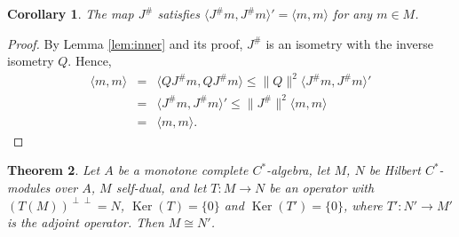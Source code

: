 \documentclass[12pt]{amsart}
\newtheorem{teo}{Theorem}%
\newtheorem{cor}[teo]{Corollary}
\def\<{\langle}
\def\>{\rangle}
\begin{document}
\begin{cor}\label{ravenstvo}
The map $J^\#$ satisfies $\langle J^\#m,J^\#m\rangle'=\langle m,m\rangle$ for any $m\in M$.
\end{cor}

\begin{proof}
By Lemma \ref{lem:inner} and its proof,  $J^\#$ is an isometry with the inverse isometry $Q$.
Hence,
\begin{eqnarray*}
\<m,m\>&=&\<Q J^\# m, Q J^\#m\> \le \|Q\|^2 \<J^\# m,J^\# m\>'\\
&=&\<J^\# m,J^\# m\>' \le \|J^\#\|^2 \<m,m\>\\
&=&\<m,m\>.
\end{eqnarray*}
\end{proof} 


\begin{teo}\label{teo:corrected_ext}
	Let $A$ be a monotone complete $C^*$-algebra, let $M$, $N$ be Hilbert $C^*$-modules over $A$, $M$ self-dual, and let $T:M\to N$ be an operator with $(T(M))^{\perp\perp}=N$, $\operatorname{Ker}(T)=\{0\}$ and $\operatorname{Ker}(T')=\{0\}$,
where $T':N'\to M'$ is the adjoint operator. 
	Then $M \cong N'$.
\end{teo}	
\end{document}
